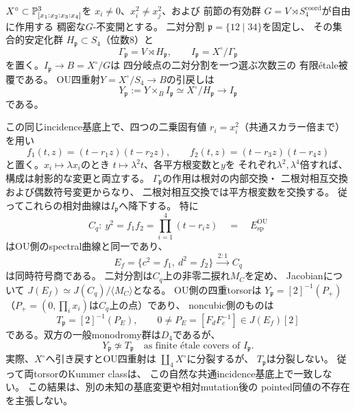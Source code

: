 \begin{theorem}
\label{thm:qa-ou-half-period-common-incidence-not-isomorphic}
$X^\circ\subset\mathbb P^3_{[x_1:x_2:x_3:x_4]}$を
$x_i\ne0$、$x_i^2\ne x_j^2$、および
前節の有効群
$G=V\rtimes S_4^{\mathrm{coord}}$が自由に作用する
稠密な$G$-不変開とする。
二対分割
$\mathfrak p=\{12\mid34\}$を固定し、
その集合的安定化群
$H_{\mathfrak p}\subset S_4$（位数$8$）と
\[
 \Gamma_{\mathfrak p}=V\rtimes H_{\mathfrak p},
 \qquad
 I_{\mathfrak p}=X^\circ/\Gamma_{\mathfrak p}
\]
を置く。$I_{\mathfrak p}\to B=X^\circ/G$は
四分岐点の二対分割を一つ選ぶ次数三の
有限\'{e}tale被覆である。
OU四重射$Y=X^\circ/S_4\to B$の引戻しは
\[
 Y_{\mathfrak p}
 :=Y\times_BI_{\mathfrak p}
 \simeq X^\circ/H_{\mathfrak p}
 \longrightarrow I_{\mathfrak p}
\]
である。

この同じincidence基底上で、四つの二乗固有値
$r_i=x_i^2$（共通スカラー倍まで）を用い
\begin{equation}
 f_1(t,z)=(t-r_1z)(t-r_2z),\qquad
 f_2(t,z)=(t-r_3z)(t-r_4z)
 \label{eq:qa-common-incidence-rootpair}
\end{equation}
と置く。$x_i\mapsto\lambda x_i$のとき
$t\mapsto\lambda^2t$、各平方根変数と$y$を
それぞれ$\lambda^2,\lambda^4$倍すれば、
構成は射影的な変更と両立する。
$\Gamma_{\mathfrak p}$の作用は根対の内部交換・
二根対相互交換および偶数符号変更からなり、
二根対相互交換では平方根変数を交換する。
従ってこれらの相対曲線は$I_{\mathfrak p}$へ降下する。
特に
\begin{equation}
 C_q:\ y^2=f_1f_2=\prod_{i=1}^4(t-r_iz)
       \quad=\quad E_{\mathrm{sp}}^{\mathrm{OU}}
 \label{eq:qa-common-ou-noncubic-spectral}
\end{equation}
はOU側のspectral曲線と同一であり、
\[
 E_f=\{c^2=f_1,\ d^2=f_2\}
   \xrightarrow{\;2:1\;} C_q
\]
は同時符号商である。
二対分割は$C_q$上の非零二捩れ$M_C$を定め、
Jacobianについて
$J(E_f)\simeq J(C_q)/\langle M_C\rangle$となる。
OU側の四重torsorは
$Y_{\mathfrak p}=[2]^{-1}(P_+)$
（$P_+=(0,\prod_i x_i)$は$C_q$上の点）であり、
noncubic側のものは
\[
 T_{\mathfrak p}
   =[2]^{-1}(P_E),\qquad
 0\ne P_E=[F_dF_c^{-1}]\in J(E_f)[2]
\]
である。双方の一般monodromy群は$D_4$であるが、
\begin{equation}
 \boxed{Y_{\mathfrak p}\not\simeq T_{\mathfrak p}
 \quad\text{as finite \'etale covers of }I_{\mathfrak p}.}
 \label{eq:qa-ou-half-common-incidence-nonisom}
\end{equation}
実際、$X^\circ$へ引き戻すとOU四重射は
$\coprod_{4}X^\circ$に分裂するが、
$T_{\mathfrak p}$は分裂しない。
従って両torsorのKummer classは、
この自然な共通incidence基底上で一致しない。
この結果は、別の未知の基底変更や相対mutation後の
pointed同値の不存在を主張しない。
\end{theorem}
